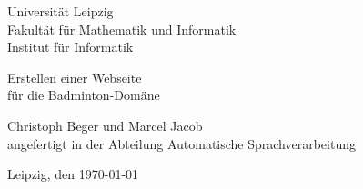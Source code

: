   \begin{titlepage}

	\vspace*{0.5cm}

 \begin{center} \large 
    
    \huge {Universität Leipzig} \\
    \large Fakultät für Mathematik und Informatik \\
    Institut für Informatik \\
    \vspace*{2cm}

    {\huge Erstellen einer Webseite \\
    \vspace*{0.2cm}
    \huge für die Badminton-Domäne}
    \vspace*{1.5cm}

    Christoph Beger und Marcel Jacob \\ 
    \vspace*{0.5cm}
    angefertigt in der Abteilung Automatische Sprachverarbeitung
    \vspace*{1.5cm}

    Leipzig, den \today
    \vspace*{3cm}
    
  \end{center}
\end{titlepage}